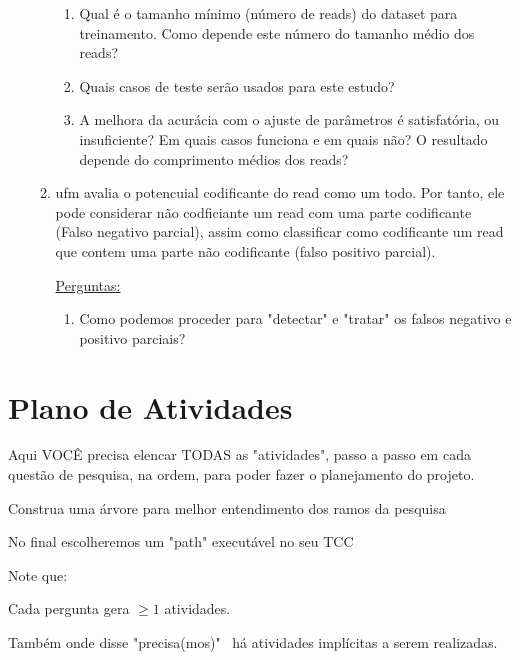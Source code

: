 \documentclass[12pt]{article}
\begin{document}
\begin{enumerate}
\begin{enumerate}
\begin{enumerate}
        \item Qual é o tamanho mínimo (número de reads) do dataset para treinamento. Como depende este número do tamanho médio dos reads?
        
        \item Quais casos de teste serão usados para este estudo?
        
        \item A melhora da acurácia com o ajuste de parâmetros é satisfatória, ou insuficiente? Em quais casos funciona e em quais não? O resultado depende do comprimento médios dos reads?
        
    \end{enumerate}
    
    \item \gls{ufm} avalia o potencuial codificante do read como um todo. Por tanto, ele pode considerar não codficiante um read com uma parte codificante (Falso negativo parcial), assim como classificar como codificante um read que contem uma parte não codificante (falso positivo parcial). 
    
    \underline{Perguntas:}
    
    \begin{enumerate}
        \item Como podemos proceder para "detectar" e "tratar" os falsos negativo e positivo parciais?
        
    \end{enumerate}
    
\end{enumerate}

\end{enumerate}

\section{Plano de Atividades}

Aqui VOCÊ precisa elencar TODAS as "atividades", passo a passo em cada questão de pesquisa, na ordem, para poder fazer o planejamento do projeto.

Construa uma árvore para melhor entendimento dos ramos da pesquisa

No final escolheremos um "path" executável no seu TCC

Note que:

Cada pergunta gera $\ge 1$ atividades. 

Também onde disse "precisa(mos)" \ há atividades implícitas a serem realizadas. 
\end{document}
